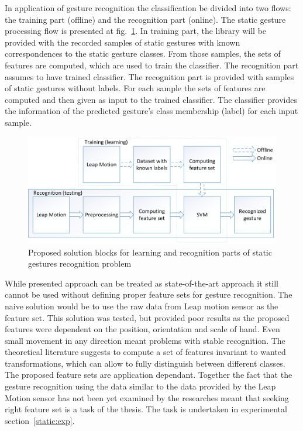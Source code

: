 In application of gesture recognition the classification be divided into two flows: the training part (offline) and the recognition part (online). 
The static gesture processing flow is presented at fig.~\ref{staticsol}.
In training part, the library will be provided with the recorded samples of static gestures with known correspondences to the static gesture classes. 
From those samples, the sets of features are computed, which are used to train the classifier.
The recognition part assumes to have trained classifier. 
The recognition part is provided with samples of static gestures without labels. 
For each sample the sets of features are computed and then given as input to the trained classifier.
The classifier provides the information of the predicted gesture's class membership (label) for each input sample.

\begin{figure}[htb]
\centering
 \includegraphics[width=1\columnwidth]{figures/StaticGestures.png}
 \caption[]{Proposed solution blocks for learning and recognition parts of static gestures recognition problem}
 \label{staticsol}
\end{figure}

While presented approach can be treated as state-of-the-art approach it still cannot be used without defining proper feature sets for gesture recognition.
The naive solution would be to use the raw data from Leap motion sensor as the feature set.
This solution was tested, but provided poor results as the proposed features were dependent on the position, orientation and scale of hand. 
Even small movement in any direction meant problems with stable recognition. 
The theoretical literature suggests to compute a set of features invariant to wanted transformations, which can allow to fully distinguish between different classes.
The proposed feature sets are application dependant.
Together the fact that the gesture recognition using the data similar to the data provided by the Leap Motion sensor has not been yet examined by the researches meant that seeking right feature set is a task of the thesis.
The task is undertaken in experimental section~\ref{static:exp}.

